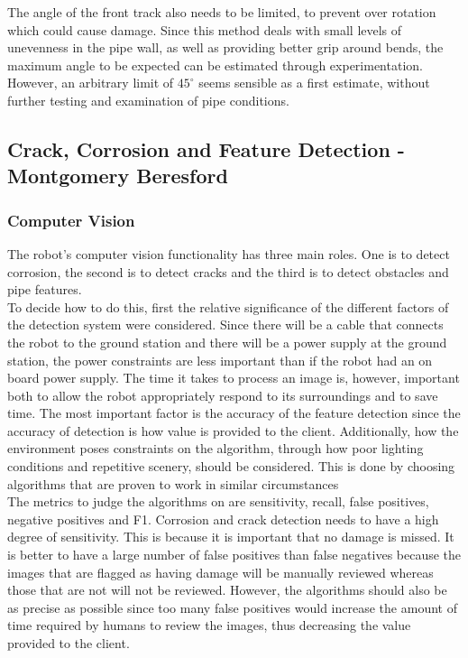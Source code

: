 \documentclass[11pt]{article}		%
\begin{document}
			The angle of the front track also needs to be limited, to prevent over rotation which could cause damage.
			Since this method deals with small levels of unevenness in the pipe wall, as well as providing better grip around bends, the maximum angle to be expected can be estimated through experimentation.
			However, an arbitrary limit of $45^\circ$ seems sensible as a first estimate, without further testing and examination of pipe conditions.
				
		\subsection[Crack, Corrosion and Feature Detection]{Crack, Corrosion and Feature Detection - Montgomery Beresford} \label{featureDetection}
		
		\subsubsection{Computer Vision}
		
			The robot’s computer vision functionality has three main roles. 
			One is to detect corrosion, the second is to detect cracks and the third is to detect obstacles and pipe features.
			\\
	        To decide how to do this, first the relative significance of the different factors of the detection system were considered. 
	        Since there will be a cable that connects the robot to the ground station and there will be a power supply at the ground station, the power constraints are less important than if the robot had an on board power supply. 
	        The time it takes to process an image is, however, important both to allow the robot appropriately respond to its surroundings and to save time. 
	        The most important factor is the accuracy of the feature detection since the accuracy of detection is how value is provided to the client.
	        Additionally, how the environment poses constraints on the algorithm, through how poor lighting conditions and repetitive scenery, should be considered. This is done by choosing algorithms that are proven to work in similar circumstances
	        \\
	        The metrics to judge the algorithms on are sensitivity, recall, false positives, negative positives and F1.
	        Corrosion and crack detection needs to have a high degree of sensitivity. 
	        This is because it is important that no damage is missed. 
	        It is better to have a large number of false positives than false negatives because the images that are flagged as having damage will be manually reviewed whereas those that are not will not be reviewed. 
	        However, the algorithms should also be as precise as possible since too many false positives would increase the amount of time required by humans to review the images, thus decreasing the value provided to the client.
        
\end{document}
